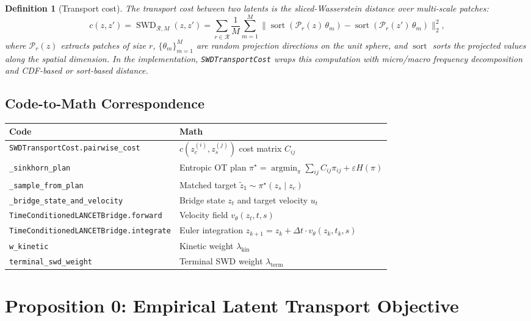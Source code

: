 \documentclass[letterpaper]{article}
\newtheorem{definition}[proposition]{Definition}
\newcommand{\SWD}{\operatorname{SWD}}
\newcommand{\argmin}{\operatorname{argmin}}
\newcommand{\sort}{\operatorname{sort}}
\begin{document}
\begin{definition}[Transport cost]
The transport cost between two latents is the sliced-Wasserstein distance
over multi-scale patches:
\begin{equation}
    c(z, z') = \SWD_{\mathcal{R}, M}(z, z')
    = \sum_{r \in \mathcal{R}} \frac{1}{M} \sum_{m=1}^M
    \bigl\| \sort(\mathcal{P}_r(z)\,\theta_m) - \sort(\mathcal{P}_r(z')\,\theta_m) \bigr\|_2^2,
\end{equation}
where $\mathcal{P}_r(z)$ extracts patches of size $r$, $\{\theta_m\}_{m=1}^M$ are
random projection directions on the unit sphere, and $\sort$ sorts the projected
values along the spatial dimension.
In the implementation, \texttt{SWDTransportCost} wraps this computation with
micro/macro frequency decomposition and CDF-based or sort-based distance.
\end{definition}

\subsection{Code-to-Math Correspondence}

\begin{tabular}{|l|l|}
\hline
\textbf{Code} & \textbf{Math} \\
\hline
\texttt{SWDTransportCost.pairwise\_cost} & $c(z_c^{(i)}, z_s^{(j)})$ cost matrix $C_{ij}$ \\
\texttt{\_sinkhorn\_plan} & Entropic OT plan $\pi^\star = \argmin_\pi \sum_{ij}C_{ij}\pi_{ij} + \varepsilon H(\pi)$ \\
\texttt{\_sample\_from\_plan} & Matched target $\tilde z_1 \sim \pi^\star(z_s \mid z_c)$ \\
\texttt{\_bridge\_state\_and\_velocity} & Bridge state $z_t$ and target velocity $u_t$ \\
\texttt{TimeConditionedLANCETBridge.forward} & Velocity field $v_\theta(z_t, t, s)$ \\
\texttt{TimeConditionedLANCETBridge.integrate} & Euler integration $z_{k+1} = z_k + \Delta t \cdot v_\theta(z_k, t_k, s)$ \\
\texttt{w\_kinetic} & Kinetic weight $\lambda_{\text{kin}}$ \\
\texttt{terminal\_swd\_weight} & Terminal SWD weight $\lambda_{\text{term}}$ \\
\hline
\end{tabular}


\section{Proposition 0: Empirical Latent Transport Objective}
\end{document}
